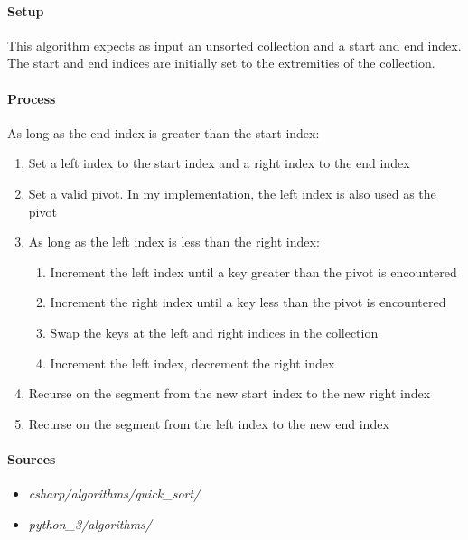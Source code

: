 \documentclass{article}
\begin{document}
\paragraph{Setup}
This algorithm expects as input an unsorted collection and a start and end index. The start and end indices are
initially set to the extremities of the collection.

\paragraph{Process}
As long as the end index is greater than the start index:
\begin{enumerate}
\item{Set a left index to the start index and a right index to the end index}
\item{Set a valid pivot. In my implementation, the left index is also used as the pivot}
\item{As long as the left index is less than the right index:}
  \begin{enumerate}
  \item{Increment the left index until a key greater than the pivot is encountered}
  \item{Increment the right index until a key less than the pivot is encountered}
  \item{Swap the keys at the left and right indices in the collection}
  \item{Increment the left index, decrement the right index}
  \end{enumerate}
\item{Recurse on the segment from the new start index to the new right index}
\item{Recurse on the segment from the left index to the new end index}
\end{enumerate}

\begin{samepage}
  \paragraph{Sources}
  \begin{itemize}
  \item{{\em csharp/algorithms/quick\_sort/}}
  \item{{\em python\_3/algorithms/}}
  \end{itemize}
\end{samepage}
\end{document}
